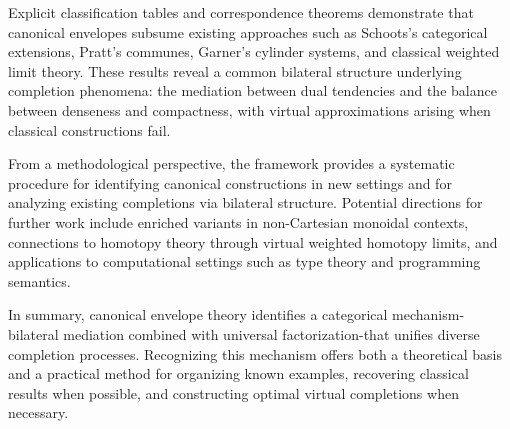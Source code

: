 \documentclass[11pt]{article}
\theoremstyle{plain}
\theoremstyle{definition}
\theoremstyle{remark}
\begin{document}
Explicit classification tables and correspondence theorems demonstrate that canonical envelopes subsume existing approaches such as Schoots's categorical extensions, Pratt's communes, Garner's cylinder systems, and classical weighted limit theory.  
These results reveal a common bilateral structure underlying completion phenomena: the mediation between dual tendencies and the balance between denseness and compactness, with virtual approximations arising when classical constructions fail.

From a methodological perspective, the framework provides a systematic procedure for identifying canonical constructions in new settings and for analyzing existing completions via bilateral structure.  
Potential directions for further work include enriched variants in non-Cartesian monoidal contexts, connections to homotopy theory through virtual weighted homotopy limits, and applications to computational settings such as type theory and programming semantics.

In summary, canonical envelope theory identifies a categorical mechanism-bilateral mediation combined with universal factorization-that unifies diverse completion processes.  
Recognizing this mechanism offers both a theoretical basis and a practical method for organizing known examples, recovering classical results when possible, and constructing optimal virtual completions when necessary.


\end{document}
